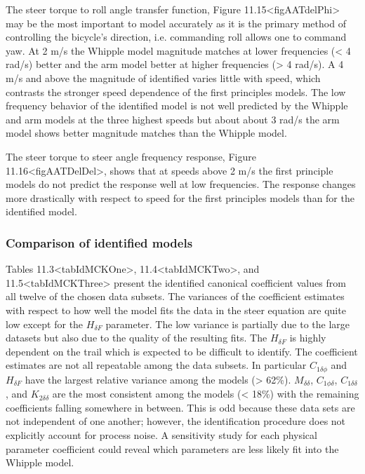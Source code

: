 \documentclass[a4paper]{article}
\begin{document}
The steer torque to roll angle transfer function, Figure
11.15\textless{}figAATdelPhi\textgreater{} may be the most important to
model accurately as it is the primary method of controlling the
bicycle's direction, i.e. commanding roll allows one to command yaw. At
2 m/s the Whipple model magnitude matches at lower frequencies
(\textless{} 4 rad/s) better and the arm model better at higher
frequencies (\textgreater{} 4 rad/s). A 4 m/s and above the magnitude of
identified varies little with speed, which contrasts the stronger speed
dependence of the first principles models. The low frequency behavior of
the identified model is not well predicted by the Whipple and arm models
at the three highest speeds but about about 3 rad/s the arm model shows
better magnitude matches than the Whipple model.


The steer torque to steer angle frequency response, Figure
11.16\textless{}figAATDelDel\textgreater{}, shows that at speeds above 2
m/s the first principle models do not predict the response well at low
frequencies. The response changes more drastically with respect to speed
for the first principles models than for the identified model.


\subsubsection{Comparison of identified models}

Tables 11.3\textless{}tabIdMCKOne\textgreater{},
11.4\textless{}tabIdMCKTwo\textgreater{}, and
11.5\textless{}tabIdMCKThree\textgreater{} present the identified
canonical coefficient values from all twelve of the chosen data subsets.
The variances of the coefficient estimates with respect to how well the
model fits the data in the steer equation are quite low except for the
$H_{\delta F}$ parameter. The low variance is partially due to the large
datasets but also due to the quality of the resulting fits. The
$H_{\delta F}$ is highly dependent on the trail which is expected to be
difficult to identify. The coefficient estimates are not all repeatable
among the data subsets. In particular $C_{1\delta\phi}$ and
$H_{\delta F}$ have the largest relative variance among the models
(\textgreater{} 62\%). $M_{\delta\delta}$, $C_{1\phi\delta}$,
$C_{1\delta\delta}$, and $K_{2\delta\delta}$ are the most consistent
among the models (\textless{} 18\%) with the remaining coefficients
falling somewhere in between. This is odd because these data sets are
not independent of one another; however, the identification procedure 
does not explicitly account for process noise. A sensitivity
study for each physical parameter coefficient could reveal which parameters
are less likely fit into the Whipple model.
\end{document}
